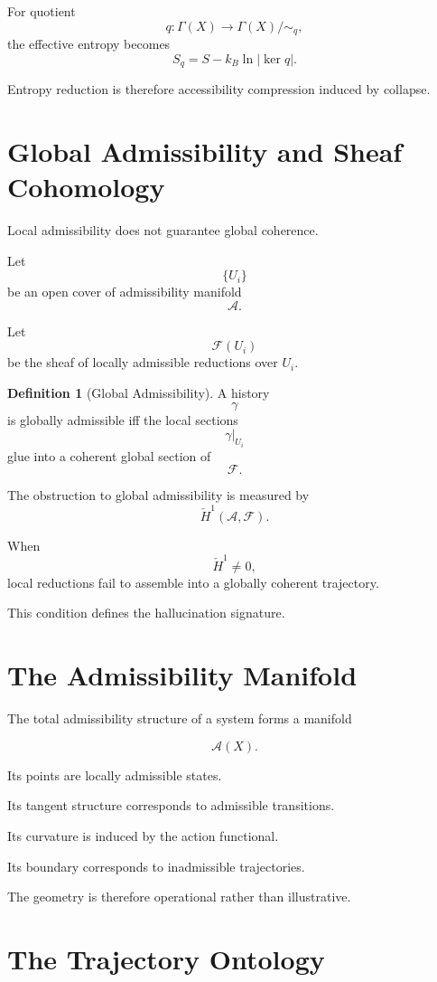 \documentclass[12pt,openany]{book}
\theoremstyle{plain}
\theoremstyle{definition}
\newtheorem{definition}[theorem]{Definition}
\theoremstyle{remark}
\begin{document}
For quotient
\[
q :
\Gamma(X)\to\Gamma(X)/{\sim_q},
\]
the effective entropy becomes
\[
S_q
=
S
-
k_B\ln|\ker q|.
\]

Entropy reduction is therefore accessibility compression induced
by collapse.

\section{Global Admissibility and Sheaf Cohomology}

Local admissibility does not guarantee global coherence.

Let
\[
\{U_i\}
\]
be an open cover of admissibility manifold
\[
\mathcal{A}.
\]

Let
\[
\mathcal{F}(U_i)
\]
be the sheaf of locally admissible reductions over \(U_i\).

\begin{definition}[Global Admissibility]
A history
\[
\gamma
\]
is globally admissible iff the local sections
\[
\gamma|_{U_i}
\]
glue into a coherent global section of
\[
\mathcal{F}.
\]
\end{definition}

The obstruction to global admissibility is measured by
\[
\check{H}^1(\mathcal{A},\mathcal{F}).
\]

When
\[
\check{H}^1 \neq 0,
\]
local reductions fail to assemble into a globally coherent
trajectory.

This condition defines the hallucination signature.

\section{The Admissibility Manifold}

The total admissibility structure of a system forms a manifold

\[
\mathcal{A}(X).
\]

Its points are locally admissible states.

Its tangent structure corresponds to admissible transitions.

Its curvature is induced by the action functional.

Its boundary corresponds to inadmissible trajectories.

The geometry is therefore operational rather than illustrative.

\section{The Trajectory Ontology}
\end{document}
